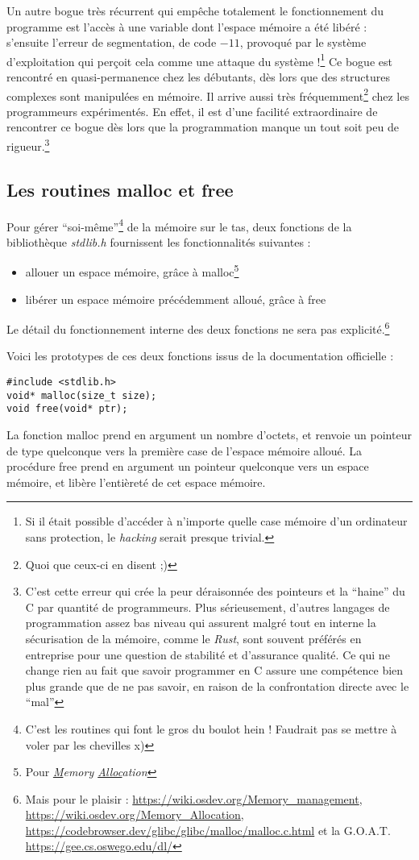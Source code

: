 \documentclass[../../../main.tex]{subfiles}
\begin{document}
Un autre bogue très récurrent qui empêche totalement le fonctionnement du programme est l'accès à une variable dont l'espace mémoire a été libéré : s'ensuite l'erreur de segmentation, de code $-11$, provoqué par le système d'exploitation qui perçoit cela comme une attaque du système !\footnote{Si il était possible d'accéder à n'importe quelle case mémoire d'un ordinateur sans protection, le \textit{hacking} serait presque trivial.} Ce bogue est rencontré en quasi-permanence chez les débutants, dès lors que des structures complexes sont manipulées en mémoire. Il arrive aussi très fréquemment\footnote{Quoi que ceux-ci en disent ;)} chez les programmeurs expérimentés. En effet, il est d'une facilité extraordinaire de rencontrer ce bogue dès lors que la programmation manque un tout soit peu de rigueur.\footnote{C'est cette erreur qui crée la peur déraisonnée des pointeurs et la ``haine'' du C par quantité de programmeurs. Plus sérieusement, d'autres langages de programmation assez bas niveau qui assurent malgré tout en interne la sécurisation de la mémoire, comme le \textit{Rust}, sont souvent préférés en entreprise pour une question de stabilité et d'assurance qualité. Ce qui ne change rien au fait que savoir programmer en C assure une compétence bien plus grande que de ne pas savoir, en raison de la confrontation directe avec le ``mal''}
\subsection{Les routines \textsf{malloc} et \textsf{free}}
Pour gérer ``soi-même''\footnote{C'est les routines qui font le gros du boulot hein ! Faudrait pas se mettre à voler par les chevilles x)} de la mémoire sur le tas, deux fonctions de la bibliothèque \textit{stdlib.h} fournissent les fonctionnalités suivantes :
\begin{itemize}
	\item allouer un espace mémoire, grâce à \textsf{malloc}\footnote{Pour \textit{\underline{M}emory \underline{Alloc}ation}}
	\item libérer un espace mémoire précédemment alloué, grâce à \textsf{free}
\end{itemize}
Le détail du fonctionnement interne des deux fonctions ne sera pas explicité.\footnote{Mais pour le plaisir : \url{https://wiki.osdev.org/Memory_management}, \url{https://wiki.osdev.org/Memory_Allocation}, \url{https://codebrowser.dev/glibc/glibc/malloc/malloc.c.html} et la G.O.A.T. \url{https://gee.cs.oswego.edu/dl/}}
 
Voici les prototypes de ces deux fonctions issus de la documentation officielle :
\begin{verbatim}
#include <stdlib.h>
void* malloc(size_t size);
void free(void* ptr);
\end{verbatim}
La fonction \textsf{malloc} prend en argument un nombre d'octets, et renvoie un pointeur de type quelconque vers la première case de l'espace mémoire alloué. La procédure \textsf{free} prend en argument un pointeur quelconque vers un espace mémoire, et libère l'entièreté de cet espace mémoire.
 
\end{document}

